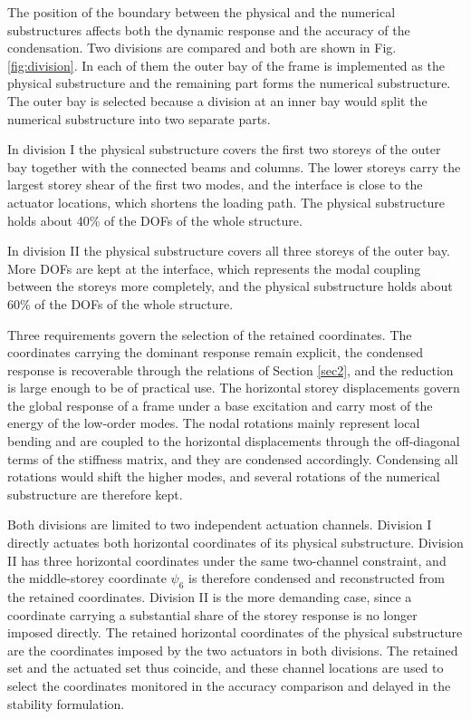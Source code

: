 \documentclass[a4paper,fleqn,review,12pt]{cas-sc}
\begin{document}
The position of the boundary between the physical and the numerical substructures affects both the dynamic response and the accuracy of the condensation. Two divisions are compared and both are shown in Fig. \ref{fig:division}. In each of them the outer bay of the frame is implemented as the physical substructure and the remaining part forms the numerical substructure. The outer bay is selected because a division at an inner bay would split the numerical substructure into two separate parts.

In division I the physical substructure covers the first two storeys of the outer bay together with the connected beams and columns. The lower storeys carry the largest storey shear of the first two modes, and the interface is close to the actuator locations, which shortens the loading path. The physical substructure holds about 40\% of the DOFs of the whole structure.

In division II the physical substructure covers all three storeys of the outer bay. More DOFs are kept at the interface, which represents the modal coupling between the storeys more completely, and the physical substructure holds about 60\% of the DOFs of the whole structure.

Three requirements govern the selection of the retained coordinates. The coordinates carrying the dominant response remain explicit, the condensed response is recoverable through the relations of Section \ref{sec2}, and the reduction is large enough to be of practical use. The horizontal storey displacements govern the global response of a frame under a base excitation and carry most of the energy of the low-order modes. The nodal rotations mainly represent local bending and are coupled to the horizontal displacements through the off-diagonal terms of the stiffness matrix, and they are condensed accordingly. Condensing all rotations would shift the higher modes, and several rotations of the numerical substructure are therefore kept.

Both divisions are limited to two independent actuation channels. Division I directly actuates both horizontal coordinates of its physical substructure. Division II has three horizontal coordinates under the same two-channel constraint, and the middle-storey coordinate \(\psi_{6}\) is therefore condensed and reconstructed from the retained coordinates. Division II is the more demanding case, since a coordinate carrying a substantial share of the storey response is no longer imposed directly. The retained horizontal coordinates of the physical substructure are the coordinates imposed by the two actuators in both divisions. The retained set and the actuated set thus coincide, and these channel locations are used to select the coordinates monitored in the accuracy comparison and delayed in the stability formulation.
\end{document}
